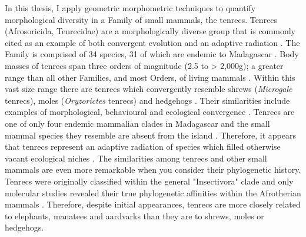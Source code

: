 	In this thesis, I apply geometric morphometric techniques to quantify morphological diversity in a Family of small mammals, the tenrecs. Tenrecs (Afrosoricida, Tenrecidae) are a morphologically diverse group that is commonly cited as an example of both convergent evolution and an adaptive radiation \citep{Soarimalala2011, Eisenberg1969}. The Family is comprised of 34 species, 31 of which are endemic to Madagascar \citep{Olson2013}. Body masses of tenrecs span three orders of magnitude (2.5 to > 2,000g); a greater range than all other Families, and most Orders, of living mammals \citep{Olson2003}. Within this vast size range there are tenrecs which convergently resemble shrews (\textit{Microgale} tenrecs), moles (\textit{Oryzorictes} tenrecs) and hedgehogs \citep[\textit{Echinops} and \textit{Setifer} tenrecs,][Figure \ref{fig:tenrecs}]{Eisenberg1969}. Their similarities include examples of morphological, behavioural and ecological convergence \citep{Soarimalala2011}. Tenrecs are one of only four endemic mammalian clades in Madagascar and the small mammal species they resemble are absent from the island \citep{Garbutt1999}. Therefore, it appears that tenrecs represent an adaptive radiation of species which filled otherwise vacant ecological niches \citep{Soarimalala2011}.
	The similarities among tenrecs and other small mammals are even more remarkable when you consider their phylogenetic history. Tenrecs were originally classified within the general "Insectivora" clade and only molecular studies revealed their true phylogenetic affinities within the Afrotherian mammals \citep{Stanhope1998}. Therefore, despite initial appearances, tenrecs are more closely related to elephants, manatees and aardvarks than they are to shrews, moles or hedgehogs. 
